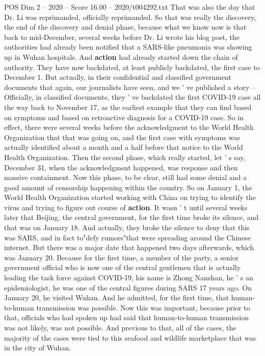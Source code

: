 \begin{textsample}{POS Dim 2 – 2020 – Score 16.00 – 2020/t004292.txt}
That was also the day that Dr.
Li was reprimanded, officially reprimanded.
So that was really the discovery, the end of the discovery and denial phase, because what we know now is that back to mid-December, several weeks before Dr.
Li wrote his blog post, the authorities had already been notified that a SARS-like pneumonia was showing up in Wuhan hospitals.
And \textbf{action} had already started down the chain of authority.
They have now backdated, at least publicly backdated, the first case to December 1.
But actually, in their confidential and classified government documents that again, our journalists have seen, and we ' ve published a story -- Officially, in classified documents, they ' ve backdated the first COVID-19 case all the way back to November 17, as the earliest example that they can find based on symptoms and based on retroactive diagnosis for a COVID-19 case.
So in effect, there were several weeks before the acknowledgment to the World Health Organization that that was going on, and the first case with symptoms was actually identified about a month and a half before that notice to the World Health Organization.
Then the second phase, which really started, let ' s say, December 31, when the acknowledgment happened, was response and then massive containment.
Now this phase, to be clear, still had some denial and a good amount of censorship happening within the country.
So on January 1, the World Health Organization started working with China on trying to identify the virus and trying to figure out course of \textbf{action}.
It wasn ' t until several weeks later that Beijing, the central government, for the first time broke its silence, and that was on January 18.
And actually, they broke the silence to deny that this was SARS, and in fact to"defy rumors"that were spreading around the Chinese internet.
But there was a major date that happened two days afterwards, which was January 20.
Because for the first time, a member of the party, a senior government official who is now one of the central gentlemen that is actually leading the task force against COVID-19, his name is Zhong Nanshan, he ' s an epidemiologist, he was one of the central figures during SARS 17 years ago.
On January 20, he visited Wuhan.
And he admitted, for the first time, that human-to-human transmission was possible.
Now this was important, because prior to that, officials who had spoken up had said that human-to-human transmission was not likely, was not possible.
And previous to that, all of the cases, the majority of the cases were tied to this seafood and wildlife marketplace that was in the city of Wuhan.

\end{textsample}
